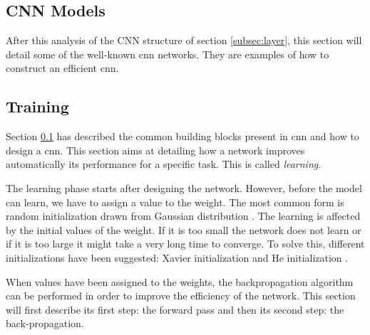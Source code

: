 \subsection{CNN Models} \label{subsec:models}
After this analysis of the CNN structure of section \ref{subsec:layer}, this section will detail some of the well-known \acrshort{cnn} networks. They are examples of how to construct an efficient \acrshort{cnn}.

%

%
%
\subsection{Training} \label{subsec:train}
Section \ref{subsec:models} has described the common building blocks present in \acrshort{cnn} and how to design a \acrshort{cnn}. This section aims at detailing how a network improves automatically its performance for a specific task. This is called \textit{learning}.

The learning phase starts after designing the network. However, before the model can learn, we have to assign a value to the weight. The most common form is random initialization drawn from Gaussian distribution \cite{he_delving_2015}. The learning is affected by the initial values of the weight. If it is too small the network does not learn or if it is too large it might take a very long time to converge. To solve this, different initializations have been suggested: Xavier initialization \cite{glorot_understanding_2010} and He initialization \cite{he_delving_2015}.

When values have been assigned to the weights, the backpropagation algorithm can be performed in order to improve the efficiency of the network. This section will first describe its first step: the forward pass and then its second step: the back-propagation.
%

%

%
%
